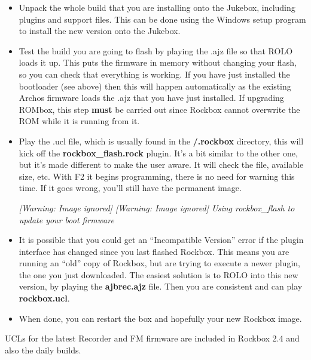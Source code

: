 \begin{itemize}
\item Unpack the whole build that you are installing onto the Jukebox,
including plugins and support files.  This can be done using the Windows setup program to install the new version onto the Jukebox.
\item Test the build you are going to flash by playing the .ajz file so
that ROLO loads it up.  This puts the firmware in memory without
changing your flash, so you can check that everything is working.  If
you have just installed the bootloader (see above) then this will happen automatically as the existing Archos firmware loads the .ajz that you have just installed.  If upgrading ROMbox, this step \textbf{must }be carried out since Rockbox cannot overwrite the ROM while it is running from it.  
\item Play the .ucl file, which is usually found in the
\textbf{/.rockbox} directory, this will kick off the
\textbf{rockbox\_flash.rock} plugin. It's a bit
similar to the other one, but it's made different to
make the user aware. It will check the file, available size, etc. With
F2 it begins programming, there is no need for warning this time. If it
goes wrong, you'll still have the permanent image. 

{\centering\itshape
  [Warning: Image ignored] %
 \textmd{  }  [Warning: Image ignored]
 \newline
Using rockbox\_flash to update your boot firmware
\par}
\item It is possible that you could get an ``Incompatible
Version'' error if the plugin interface has changed since
you last flashed Rockbox. This means you are running an
``old'' copy of Rockbox, but are trying to
execute a newer plugin, the one you just downloaded. The easiest
solution is to ROLO into this new version,
by playing the\textbf{ ajbrec.ajz }file. Then you are consistent and can play
\textbf{rockbox.ucl}. 
\item When done, you can restart the box and hopefully your new Rockbox
image. 
\end{itemize}
UCLs for the latest Recorder and FM firmware are included in Rockbox 2.4
and also the daily builds.

